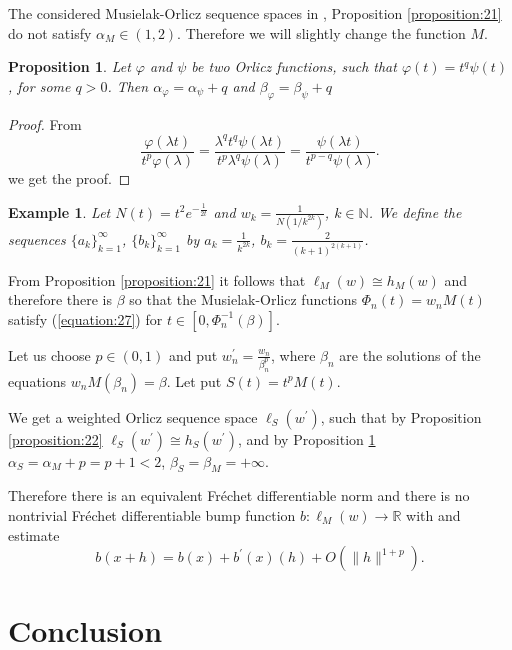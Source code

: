 \documentclass[12pt]{article}
\theoremstyle{thmstyleone}%
\newtheorem{proposition}[theorem]{Proposition}%
\theoremstyle{thmstyletwo}%
\newtheorem{example}{Example}%
\theoremstyle{thmstylethree}%
\begin{document}
{The considered Musielak-Orlicz sequence spaces in \cite{Zlatanov}, Proposition \ref{proposition:21}
do not satisfy $\alpha_M\in (1,2)$. Therefore we will slightly change the function $M$.

\begin{proposition}\label{proposition:24}
	Let $\varphi$ and $\psi$ be two Orlicz functions, such that $\varphi(t)=t^q\psi(t)$, for some $q>0$. 
	Then $\alpha_\varphi=\alpha_\psi+q$ and $\beta_\varphi=\beta_\psi+q$
\end{proposition}
\begin{proof}
	From
	$$
	\displaystyle\frac{\varphi(\lambda t)}{t^p \varphi(\lambda)}
	=\displaystyle\frac{\lambda^qt^q \psi(\lambda t)}{t^p \lambda ^q\psi(\lambda)}
	=\frac{\psi(\lambda t)}{t^{p-q}\psi(\lambda)}.
	$$ 
	we get the proof.
\end{proof}

\begin{example}
	Let $N(t)=t^2e^{-\frac{1}{2t}}$ and
	$w_k=\displaystyle\frac{1}{N(1/k^{2k})}$, $k\in\mathbb{N}$. We define the sequences
	$\{a_k\}_{k=1}^\infty$, $\{b_k\}_{k=1}^\infty$ by
	$a_k=\displaystyle\frac{1}{k^{2k}}$, $b_k=\displaystyle\frac{2}{(k+1)^{2(k+1)}}$.
\end{example}  
From Proposition \ref{proposition:21} it follows
that $\ell_M(w)\cong h_M(w)$ and therefore there is $\beta$ so that the Musielak-Orlicz functions 
$\Phi_n(t)=w_nM(t)$ satisfy (\ref{equation:27}) for $t\in [0,\Phi_n^{-1}(\beta)]$. 

Let us choose $p\in (0,1)$ and put $w_n^\prime=\frac{w_n}{\beta_n^p}$, where $\beta_n$ are the solutions of the equations $w_nM(\beta_n)=\beta$. Let put $S(t)=t^pM(t)$.

We get a weighted Orlicz sequence space $\ell_S(w^\prime)$, such that
by Proposition \ref{proposition:22} $\ell_S(w^\prime)\cong h_S(w^\prime)$, and by Proposition \ref{proposition:24} $\alpha_S=\alpha_M+p=p+1<2$, $\beta_S=\beta_M=+\infty$.


Therefore there is an equivalent Fr\'{e}chet differentiable norm and there is no
nontrivial Fr\'{e}chet differentiable bump function $b:\ell_M(w)\to\mathbb{R}$ with and estimate
$$
b(x+h)=b(x)+b^{\prime}(x)(h)+O(\|h\|^{1+p}).
$$

\section{Conclusion}\label{sec13}

}
\end{document}
